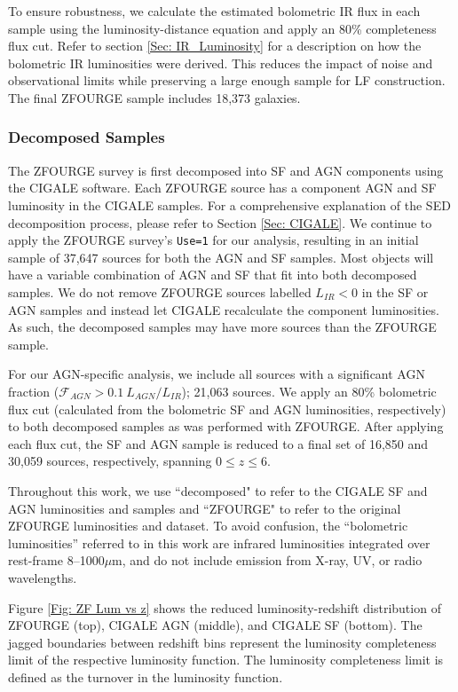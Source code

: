 To ensure robustness, we calculate the estimated bolometric IR flux in each sample using the luminosity-distance equation and apply an 80\% completeness flux cut. Refer to section \ref{Sec: IR_Luminosity} for a description on how the bolometric IR luminosities were derived. This reduces the impact of noise and observational limits while preserving a large enough sample for LF construction. The final ZFOURGE sample includes 18,373 galaxies.

\subsubsection{Decomposed Samples} \label{Sec: Decomposed AGN Selection}
The ZFOURGE survey is first decomposed into SF and AGN components using the CIGALE software. Each ZFOURGE source has a component AGN and SF luminosity in the CIGALE samples. For a comprehensive explanation of the SED decomposition process, please refer to Section \ref{Sec: CIGALE}. We continue to apply the ZFOURGE survey's \texttt{Use=1} for our analysis, resulting in an initial sample of 37,647 sources for both the AGN and SF samples. Most objects will have a variable combination of AGN and SF that fit into both decomposed samples. We do not remove ZFOURGE sources labelled $L_{IR}<0$ in the SF or AGN samples and instead let CIGALE recalculate the component luminosities. As such, the decomposed samples may have more sources than the ZFOURGE sample. 

For our AGN-specific analysis, we include all sources with a significant AGN fraction ($\mathcal{F}_{AGN}>0.1\ L_{AGN}/L_{IR}$); 21,063 sources. We apply an 80\% bolometric flux cut (calculated from the bolometric SF and AGN luminosities, respectively) to both decomposed samples as was performed with ZFOURGE. After applying each flux cut, the SF and AGN sample is reduced to a final set of 16,850 and 30,059 sources, respectively, spanning $0 \leq z \leq 6$. 

Throughout this work, we use ``decomposed" to refer to the CIGALE SF and AGN luminosities and samples and ``ZFOURGE" to refer to the original ZFOURGE luminosities and dataset. To avoid confusion, the ``bolometric luminosities” referred to in this work are infrared luminosities integrated over rest-frame 8–1000$\mu$m, and do not include emission from X-ray, UV, or radio wavelengths.

Figure \ref{Fig: ZF Lum vs z} shows the reduced luminosity-redshift distribution of ZFOURGE (top), CIGALE AGN (middle), and CIGALE SF (bottom). The jagged boundaries between redshift bins represent the luminosity completeness limit of the respective luminosity function. The luminosity completeness limit is defined as the turnover in the luminosity function.

